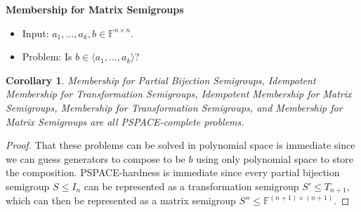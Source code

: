 \documentclass{amsart}
\newtheorem{corollary}[theorem]{Corollary}
\theoremstyle{remark}
\numberwithin{equation}{section}
\begin{document}
\medskip
{\bf Membership for Matrix Semigroups}
\begin{itemize}
\item Input: $a_1,\dots,a_k,b \in \mathbb{F}^{n \times n}$.
\item Problem: Is $b \in \langle a_1,\dots,a_k\rangle$?
\end{itemize} 

\begin{corollary}
Membership for Partial Bijection Semigroups, Idempotent Membership for Transformation Semigroups, Idempotent Membership for Matrix Semigroups, Membership for Transformation Semigroups, and Membership for Matrix Semigroups are all PSPACE-complete problems.
\end{corollary}
\begin{proof}
That these problems can be solved in polynomial space is immediate since we can guess generators to compose to be $b$ using only polynomial space to store the composition. PSPACE-hardness is immediate since every partial bijection semigroup $S \leq I_n$ can be represented as a transformation semigroup $S' \leq T_{n+1}$, which can then be represented as a matrix semigroup $S'' \leq \mathbb{F}^{(n+1) \times (n+1)}$.
\end{proof}
\end{document}
